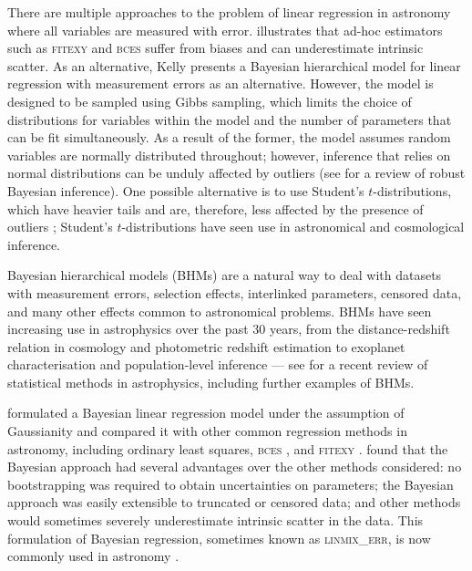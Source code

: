 \documentclass[fleqn,usenatbib]{mnras}
\begin{document}
There are multiple approaches to the problem of linear regression in astronomy
where all variables are measured with error.  \citet{Kelly:2007} illustrates
that ad-hoc estimators such as \textsc{fitexy} \citep{Press:1992, Tremaine:2002}
and \textsc{bces} \citep{Akritas:1996} suffer from biases and can underestimate
intrinsic scatter. As an alternative, Kelly presents a Bayesian hierarchical
model for linear regression with measurement errors as an alternative. However,
the model is designed to be sampled using Gibbs sampling, which limits the
choice of distributions for variables within the model and the number of
parameters that can be fit simultaneously. As a result of the former, the model
assumes random variables are normally distributed throughout; however, inference
that relies on normal distributions can be unduly affected by outliers (see
\citet{Berger:1994} for a review of robust Bayesian inference).  One possible
alternative is to use Student's $t$-distributions, which have heavier tails and
are, therefore, less affected by the presence of outliers \citep{Berger:1994};
Student's $t$-distributions have seen use in astronomical
\citep[][e.g.]{Park:2017} and cosmological \citep[][e.g.]{Feeney:2018}
inference.

Bayesian hierarchical models (BHMs) are a natural way to deal with datasets with
measurement errors, selection effects, interlinked parameters, censored data,
and many other effects common to astronomical problems. BHMs have seen
increasing use in astrophysics over the past 30 years, from the
distance-redshift relation in cosmology \citep[e.g.][]{Feeney:2018,
Avelino:2019} and photometric redshift estimation \citep[e.g.][]{Leistedt:2016}
to exoplanet characterisation \citep[e.g.][]{Sestovic:2018} and population-level
inference \citep[e.g.][]{Kelly:2009} --- see \citet{Feigelson:2021} for a recent
review of statistical methods in astrophysics, including further examples of
BHMs.

\citet{Kelly:2007} formulated a Bayesian linear regression model under the
assumption of Gaussianity and compared it with other common regression methods
in astronomy, including ordinary least squares, \textsc{bces}
\citep{Akritas:1996}, and \textsc{fitexy} \citep{Press:1992, Tremaine:2002}.
\citeauthor{Kelly:2007} found that the Bayesian approach had several advantages
over the other methods considered: no bootstrapping was required to obtain
uncertainties on parameters; the Bayesian approach was easily extensible to
truncated or censored data; and other methods would sometimes severely
underestimate intrinsic scatter in the data. This formulation of Bayesian
regression, sometimes known as \textsc{linmix\_err}, is now commonly used in
astronomy \citep[e.g.][]{McConnell:2013, Bentz:2013, Andrews:2013}.
\end{document}
